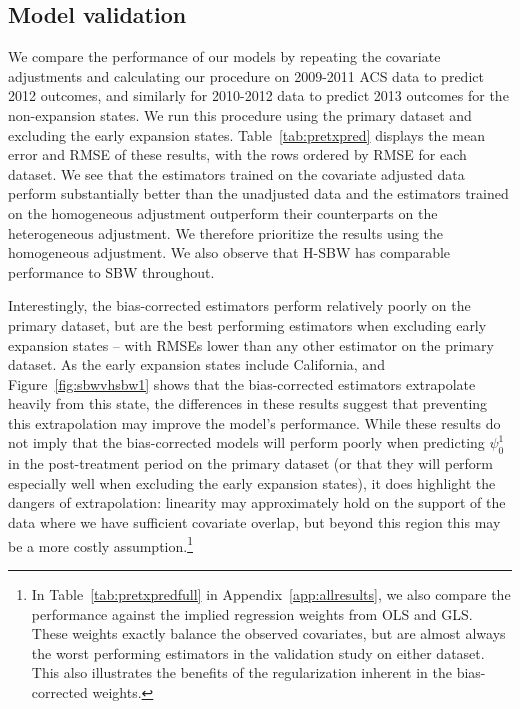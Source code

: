 \documentclass[aoas]{imsart}
\theoremstyle{plain}
\theoremstyle{remark}
\begin{document}
\subsection{Model validation}\label{sec:validation}

We compare the performance of our models by repeating the covariate adjustments and calculating our procedure on 2009-2011 ACS data to predict 2012 outcomes, and similarly for 2010-2012 data to predict 2013 outcomes for the non-expansion states. We run this procedure using the primary dataset and excluding the early expansion states. Table~\ref{tab:pretxpred} displays the mean error and RMSE of these results, with the rows ordered by RMSE for each dataset. We see that the estimators trained on the covariate adjusted data perform substantially better than the unadjusted data and the estimators trained on the homogeneous adjustment outperform their counterparts on the heterogeneous adjustment. We therefore prioritize the results using the homogeneous adjustment. We also observe that H-SBW has comparable performance to SBW throughout.

Interestingly, the bias-corrected estimators perform relatively poorly on the primary dataset, but are the best performing estimators when excluding early expansion states -- with RMSEs lower than any other estimator on the primary dataset. As the early expansion states include California, and Figure~\ref{fig:sbwvhsbw1} shows that the bias-corrected estimators extrapolate heavily from this state, the differences in these results suggest that preventing this extrapolation may improve the model's performance. While these results do not imply that the bias-corrected models will perform poorly when predicting $\psi^1_0$ in the post-treatment period on the primary dataset (or that they will perform especially well when excluding the early expansion states), it does highlight the dangers of extrapolation: linearity may approximately hold on the support of the data where we have sufficient covariate overlap, but beyond this region this may be a more costly assumption.\footnote{In Table~\ref{tab:pretxpredfull} in Appendix~\ref{app:allresults}, we also compare the performance against the implied regression weights from OLS and GLS. These weights exactly balance the observed covariates, but are almost always the worst performing estimators in the validation study on either dataset. This also illustrates the benefits of the regularization inherent in the bias-corrected weights.}
\end{document}
